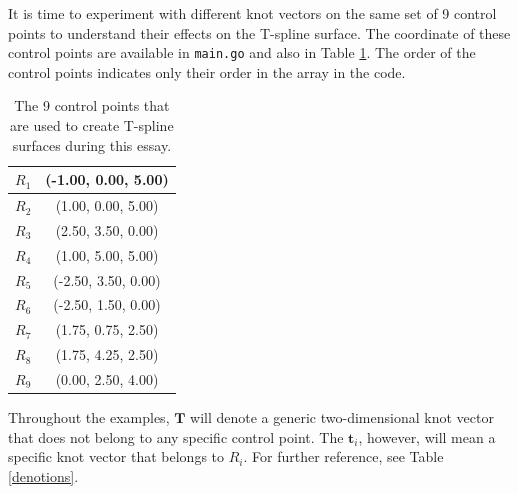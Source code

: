 \documentclass{article}
\begin{document}
\vspace{12pt}

It is time to experiment with different knot vectors on the same set of 9 control points to understand their effects on the T-spline surface. The coordinate of these control points are available in \texttt{main.go} and also in Table \ref{cps}. The order of the control points indicates only their order in the array in the code.

\begin{table}[H]
\centering
\begin{tabular}{| c | c |}
\hline
$R_1$ & (-1.00, 0.00, 5.00) \\ \hline
$R_2$ & (1.00, 0.00, 5.00) \\ \hline
$R_3$ & (2.50, 3.50, 0.00) \\ \hline
$R_4$ & (1.00, 5.00, 5.00) \\ \hline
$R_5$ & (-2.50, 3.50, 0.00) \\ \hline
$R_6$ & (-2.50, 1.50, 0.00) \\ \hline
$R_7$ & (1.75, 0.75, 2.50) \\ \hline
$R_8$ & (1.75, 4.25, 2.50) \\ \hline
$R_9$ & (0.00, 2.50, 4.00) \\
\hline
\end{tabular}
\caption{The 9 control points that are used to create T-spline surfaces during this essay.}
\label{cps}
\end{table}

Throughout the examples, $\textbf{T}$ will denote a generic two-dimensional knot vector that does not belong to any specific control point. The $\textbf{t}_i$, however, will mean a specific knot vector that belongs to $R_i$. For further reference, see Table \ref{denotions}.
\end{document}
